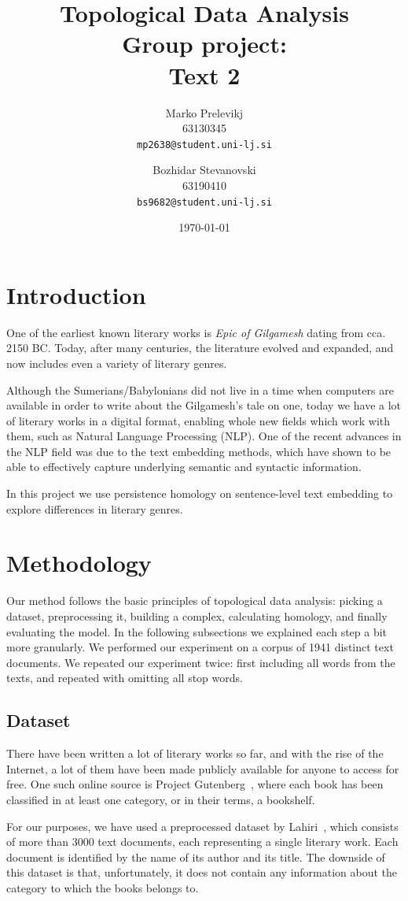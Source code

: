 \documentclass[fleqn]{article}
\title{
	Topological Data Analysis \\
	Group project: \\
	Text 2
}
\author{
	Marko Prelevikj\\
	63130345\\
	\texttt{mp2638@student.uni-lj.si}
	\and
	Bozhidar Stevanovski\\
	63190410\\
	\texttt{bs9682@student.uni-lj.si}
}
\date{\today}
\begin{document}
	
	\maketitle
	\section{Introduction} \label{intro}
	One of the earliest known literary works is \textit{Epic of Gilgamesh} dating from cca. 2150 BC. Today, after many centuries, the literature evolved and expanded, and now includes even a variety of literary genres. 
	
	Although the Sumerians/Babylonians did not live in a time when computers are available in order to write about the Gilgamesh's tale on one, today we have a lot of literary works in a digital format, enabling whole new fields which work with them, such as Natural Language Processing (NLP). One of the recent advances in the NLP field was due to the text embedding methods, which have shown to be able to effectively capture underlying semantic and syntactic information. 
	
	In this project we use persistence homology on sentence-level text embedding to explore differences in literary genres.
	
	
	\section{Methodology} \label{methods}
	Our method follows the basic principles of topological data analysis: picking a dataset, preprocessing it, building a complex, calculating homology, and finally evaluating the model. In the following subsections we explained each step a bit more granularly. We performed our experiment on a corpus of 1941 distinct text documents. We repeated our experiment twice: first including all words from the texts, and repeated with omitting all stop words.
	
	\subsection{Dataset} \label{dataset}
	There have been written a lot of literary works so far, and with the rise of the Internet, a lot of them have been made publicly available for anyone to access for free. One such online source is Project Gutenberg~\cite{projectGutenberg}, where each book has been classified in at least one category, or in their terms, a bookshelf. 
	
	For our purposes, we have used a preprocessed dataset by Lahiri~\cite{lahiri:2014:SRW}, which consists of more than 3000 text documents, each representing a single literary work. Each document is identified by the name of its author and its title. The downside of this dataset is that, unfortunately, it does not contain any information about the category to which the books belongs to.
	
\end{document}

